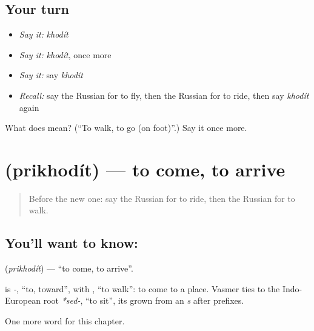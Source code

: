 \subsection*{Your turn}
\begin{itemize}
\raggedright
  \item \emph{Say it:} \emph{khodít}
  \item \emph{Say it:} \emph{khodít}, once more
  \item \emph{Say it:} say \emph{khodít}
  \item \emph{Recall:} say the Russian for to fly, then the Russian for to ride, then say \emph{khodít} again
\end{itemize}

\begin{tcolorbox}[breakable,colback=teal!4,colframe=teal!35!black,title={Before you move on}]
What does  mean? (\textquotedblleft{}To walk, to go (on foot)\textquotedblright{}.) Say it once more.
\end{tcolorbox}
\section[\texorpdfstring{\ru{приходить} (prikhodít)}{приходить (prikhodít)}]{ (prikhodít) — to come, to arrive}

\label{lesson:RU-C143-prikhodit}



\begin{quote}
Before the new one: say the Russian for to ride, then the Russian for to walk.
\end{quote}

\subsection*{You'll want to know: }
\textbf{} (\emph{prikhodít}) — \textquotedblleft{}to come, to arrive\textquotedblright{}.

\begin{cousinweb}
\textbf{} is \emph{-}, \textquotedblleft{}to, toward\textquotedblright{}, with \emph{}, \textquotedblleft{}to walk\textquotedblright{}: to come to a place. Vasmer ties \emph{} to the Indo-European root \emph{*sed-}, \textquotedblleft{}to sit\textquotedblright{}, its \emph{} grown from an \emph{s} after prefixes.
\end{cousinweb}

\begin{grammarlens}[title={What you've built}]
One more word for this chapter.
\end{grammarlens}

